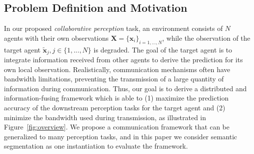 \subsection{Problem Definition and Motivation}
In our proposed \textit{collaborative perception} task, an environment consists of $N$ agents with their own observations $\bm{X} = \{\bm{x}_i\}_{i=1,...,N}$, while the observation of the target agent $\tilde{\bm{x}}_j, j\in\{1,...,N\}$ is degraded. The goal of the target agent is to integrate information received from other agents to derive the prediction for its own local observation. 
Realistically, communication mechanisms often have bandwidth limitations, preventing the transmission of a large quantity of information during communication.
Thus, our goal is to derive a distributed and information-fusing framework which is able to (1) maximize the prediction accuracy of the downstream perception tasks for the target agent and (2) minimize the bandwidth used during transmission, as illustrated in Figure~\ref{fig:overview}. 
We propose a communication framework that can be generalized to many perception tasks, and in this paper we consider semantic segmentation as one instantiation to evaluate the framework.
